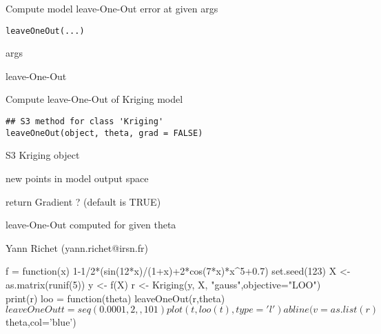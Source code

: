 \documentclass[letterpaper]{book}
\begin{document}
%
\begin{Description}\relax
Compute model leave-One-Out error at given args
\end{Description}
%
\begin{Usage}
\begin{verbatim}
leaveOneOut(...)
\end{verbatim}
\end{Usage}
%
\begin{Arguments}
\begin{ldescription}
\item[\code{...}] args
\end{ldescription}
\end{Arguments}
%
\begin{Value}
leave-One-Out
\end{Value}
%
\begin{Description}\relax
Compute leave-One-Out of Kriging model
\end{Description}
%
\begin{Usage}
\begin{verbatim}
## S3 method for class 'Kriging'
leaveOneOut(object, theta, grad = FALSE)
\end{verbatim}
\end{Usage}
%
\begin{Arguments}
\begin{ldescription}
\item[\code{object}] S3 Kriging object

\item[\code{theta}] new points in model output space

\item[\code{grad}] return Gradient ? (default is TRUE)
\end{ldescription}
\end{Arguments}
%
\begin{Value}
leave-One-Out computed for given theta
\end{Value}
%
\begin{Author}\relax
Yann Richet (yann.richet@irsn.fr)
\end{Author}
%
\begin{Examples}
\begin{ExampleCode}
f = function(x) 1-1/2*(sin(12*x)/(1+x)+2*cos(7*x)*x^5+0.7)
set.seed(123)
X <- as.matrix(runif(5))
y <- f(X)
r <- Kriging(y, X, "gauss",objective="LOO")
print(r)
loo = function(theta) leaveOneOut(r,theta)$leaveOneOut
t = seq(0.0001,2,,101)
  plot(t,loo(t),type='l')
  abline(v=as.list(r)$theta,col='blue')
\end{ExampleCode}
\end{Examples}
\end{document}
